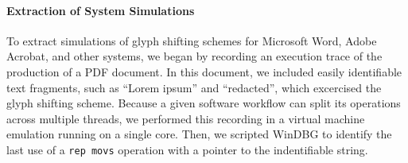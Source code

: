 \paragraph{Extraction of System Simulations}
To extract simulations of glyph shifting schemes for Microsoft Word, Adobe Acrobat, and other systems, we began by recording an execution trace of the production of a PDF document.
In this document, we included easily identifiable text fragments, such as ``Lorem ipsum'' and ``redacted'', which excercised the glyph shifting scheme.
Because a given software workflow can split its operations across multiple threads, we performed this recording in a virtual machine emulation running on a single core.
Then, we scripted WinDBG to identify the last use of a \texttt{rep movs} operation with a pointer to the indentifiable string.


